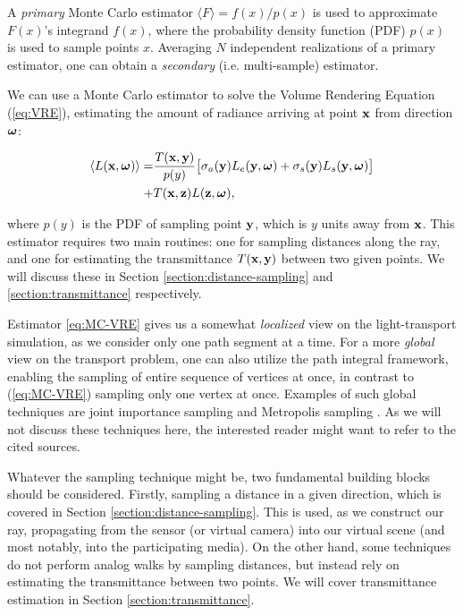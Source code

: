 A \textit{primary} Monte Carlo estimator $\langle F \rangle = f(x) / p(x)$ is used to approximate $F(x)$'s integrand $f(x)$, where the probability density function (PDF) $p(x)$ is used to sample points $x$. Averaging $N$ independent realizations of a primary estimator, one can obtain a \textit{secondary} (i.e. multi-sample) estimator. 

We can use a Monte Carlo estimator to solve the Volume Rendering Equation (\ref{eq:VRE}), estimating the amount of radiance arriving at point $\textbf{x}$ from direction $\boldsymbol{\omega}$:

\begin{align}
\begin{aligned}
\label{eq:MC-VRE}
\langle L(\textbf{x}, \boldsymbol{\omega}) \rangle 
=&
    \frac{T(\textbf{x}, \textbf{y})}{p(y)}
    \big[ 
        \sigma_a(\textbf{y})L_e(\textbf{y}, \boldsymbol{\omega}) + 
        \sigma_s(\textbf{y})L_s(\textbf{y}, \boldsymbol{\omega})
    \big]
    \\ +& 
    T(\textbf{x}, \textbf{z}) L(\textbf{z},\boldsymbol{\omega}),
\end{aligned}
\end{align}

\noindent where $p(y)$ is the PDF of sampling point $\textbf{y}$, which is $y$ units away from $\textbf{x}$. This estimator requires two main routines: one for sampling distances along the ray, and one for estimating the transmittance $T(\textbf{x}, \textbf{y})$ between two given points. We will discuss these in Section \ref{section:distance-sampling} and \ref{section:transmittance} respectively.

Estimator \ref{eq:MC-VRE} gives us a somewhat \textit{localized} view on the light-transport simulation, as we consider only one path segment at a time. For a more \textit{global} view on the transport problem, one can also utilize the path integral framework\cite{MLT-1}, enabling the sampling of entire sequence of vertices at once, in contrast to (\ref{eq:MC-VRE}) sampling only one vertex at once. Examples of such global techniques are joint importance sampling\cite{joint-importance} and Metropolis sampling \cite{MLT-2}. As we will not discuss these techniques here, the interested reader might want to refer to the cited sources.

Whatever the sampling technique might be, two fundamental building blocks should be considered. Firstly, sampling a distance in a given direction, which is covered in Section \ref{section:distance-sampling}. This is used, as we construct our ray, propagating from the sensor (or virtual camera) into our virtual scene (and most notably, into the participating media). On the other hand, some techniques do not perform analog walks by sampling distances, but instead rely on estimating the transmittance between two points. We will cover transmittance estimation in Section \ref{section:transmittance}.
